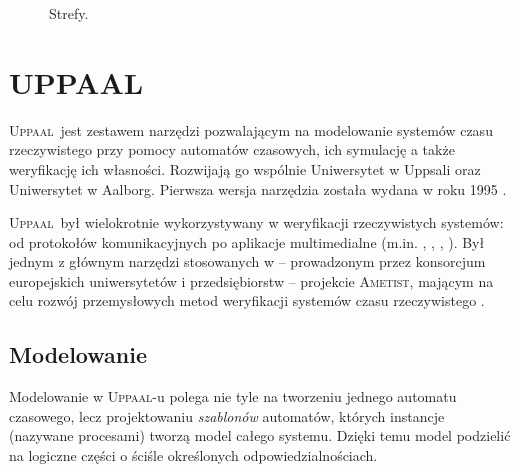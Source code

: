 \documentclass{pracamgr}
\newcommand{\upp}{\textsc{Uppaal}}
\theoremstyle{plain}
\begin{document}
\begin{figure}[ht]
  \centering
   \hspace{1cm}
  \caption{Strefy.}
  \label{img:zones}
\end{figure}

\section{UPPAAL}

\upp\ jest zestawem narzędzi pozwalającym na modelowanie systemów czasu
rzeczywistego przy pomocy automatów czasowych, ich symulację a także
weryfikację ich własności. Rozwijają go wspólnie Uniwersytet w Uppsali
oraz Uniwersytet w Aalborg. Pierwsza wersja narzędzia została wydana w roku
1995 \cite{lpw:fct95}.

\upp\ był wielokrotnie wykorzystywany w weryfikacji rzeczywistych
systemów: od protokołów komunikacyjnych po aplikacje multimedialne
(m.in. \cite{lp:prfts97}, \cite{lpw:tacas98},
\cite{DBLP:conf/icfem/BordbarO03},
\cite{Ravn:2011:MVW:1987389.1987431}). Był jednym z głównym narzędzi
stosowanych w -- prowadzonym przez konsorcjum europejskich
uniwersytetów i przedsiębiorstw -- projekcie \textsc{Ametist}, mającym
na celu rozwój przemysłowych metod weryfikacji systemów czasu
rzeczywistego \cite{AMETISTfinal}.

\subsection{Modelowanie}
Modelowanie w \upp-u polega nie tyle na tworzeniu jednego automatu
czasowego, lecz projektowaniu \emph{szablonów} automatów, których
instancje (nazywane procesami) tworzą model całego systemu. Dzięki
temu model podzielić na logiczne części o ściśle określonych
odpowiedzialnościach.
\end{document}
